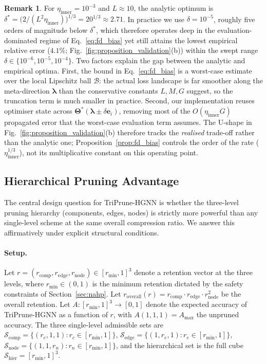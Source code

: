 \documentclass[10pt]{article}
\theoremstyle{plain}
\theoremstyle{definition}
\newtheorem{remark}{Remark}
\begin{document}
\begin{remark}
\label{rem:fd_practice}
For $\eta_{\mathrm{inner}}\!=\!10^{-3}$ and $L\!\approx\!10$, the
analytic optimum is
$\delta^{\!*}=\!\big(2/(L^{2}\eta_{\mathrm{inner}})\big)^{1/3}
=20^{1/3}\!\approx\!2.71$. In practice we use
$\delta\!=\!10^{-5}$, roughly five orders of magnitude below
$\delta^{\!*}$, which therefore operates deep in the
evaluation-dominated regime of Eq.~\eqref{eq:fd_bias} yet still
attains the lowest empirical relative error ($4.1\%$;
Fig.~\ref{fig:proposition_validation}(b)) within the swept range
$\delta\in\{10^{-6},10^{-5},10^{-4}\}$. Two factors explain the
gap between the analytic and empirical optima. First, the bound
in Eq.~\eqref{eq:fd_bias} is a worst-case estimate over the local
Lipschitz ball $\mathcal{B}$: the actual loss landscape is far
smoother along the meta-direction $\boldsymbol{\lambda}$ than the
conservative constants $L,M,G$ suggest, so the truncation term is
much smaller in practice. Second, our implementation reuses
optimiser state across
$\boldsymbol{\Theta}^{\!*}(\boldsymbol{\lambda}\!\pm\!\delta\mathbf{e}_i)$,
removing most of the $O(\eta_{\mathrm{inner}}G)$ propagated error
that the worst-case evaluation term assumes. The U-shape in
Fig.~\ref{fig:proposition_validation}(b) therefore tracks the
\emph{realised} trade-off rather than the analytic one;
Proposition~\ref{prop:fd_bias} controls the order of the rate
($\eta_{\mathrm{inner}}^{1/3}$), not its multiplicative constant
on this operating point.
\end{remark}

\subsection{Hierarchical Pruning Advantage}
\label{sec:prop_beta}

The central design question for TriPrune-HGNN is whether the
three-level pruning hierarchy (components, edges, nodes) is
strictly more powerful than any single-level scheme at the same
overall compression ratio. We answer this affirmatively under
explicit structural conditions.

\paragraph{Setup.}
Let $r=(r_{\mathrm{comp}},r_{\mathrm{edge}},r_{\mathrm{node}})
\in[r_{\min},1]^{3}$ denote a retention vector at the three
levels, where $r_{\min}\in(0,1)$ is the minimum retention dictated
by the safety constraints of Section~\ref{sec:nahp}. Let
$r_{\mathrm{overall}}(r) = r_{\mathrm{comp}}\cdot
r_{\mathrm{edge}}\cdot r_{\mathrm{node}}^{2}$ be the overall
retention. Let $A:[r_{\min},1]^{3}\to[0,1]$ denote the expected
accuracy of TriPrune-HGNN as a function of $r$, with
$A(1,1,1)=A_{\max}$ the unpruned accuracy. The three single-level
admissible sets are
$\mathcal{S}_{\mathrm{comp}}=\{(r_{c},1,1):r_{c}\in[r_{\min},1]\}$,
$\mathcal{S}_{\mathrm{edge}}=\{(1,r_{e},1):r_{e}\in[r_{\min},1]\}$,
$\mathcal{S}_{\mathrm{node}}=\{(1,1,r_{n}):r_{n}\in[r_{\min},1]\}$,
and the hierarchical set is the full cube
$\mathcal{S}_{\mathrm{hier}}=[r_{\min},1]^{3}$.
\end{document}
